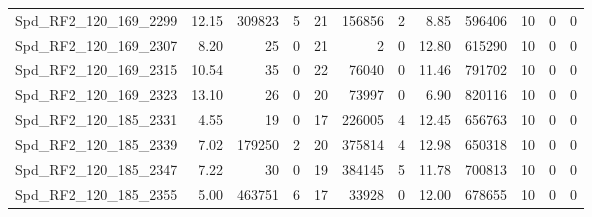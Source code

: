 \begin{longtable}[c]{@{}lrrrrrrrrrrr@{}}
Spd\_RF2\_120\_169\_2299      & 12.15                  & 309823                  & 5                       & 21                     & 156856                  & 2                       & 8.85                    & 596406                   & 10                       & 0                        & 0                        \\
Spd\_RF2\_120\_169\_2307      & 8.20                   & 25                      & 0                       & 21                     & 2                       & 0                       & 12.80                   & 615290                   & 10                       & 0                        & 0                        \\
Spd\_RF2\_120\_169\_2315      & 10.54                  & 35                      & 0                       & 22                     & 76040                   & 0                       & 11.46                   & 791702                   & 10                       & 0                        & 0                        \\
Spd\_RF2\_120\_169\_2323      & 13.10                  & 26                      & 0                       & 20                     & 73997                   & 0                       & 6.90                    & 820116                   & 10                       & 0                        & 0                        \\
Spd\_RF2\_120\_185\_2331      & 4.55                   & 19                      & 0                       & 17                     & 226005                  & 4                       & 12.45                   & 656763                   & 10                       & 0                        & 0                        \\
Spd\_RF2\_120\_185\_2339      & 7.02                   & 179250                  & 2                       & 20                     & 375814                  & 4                       & 12.98                   & 650318                   & 10                       & 0                        & 0                        \\
Spd\_RF2\_120\_185\_2347      & 7.22                   & 30                      & 0                       & 19                     & 384145                  & 5                       & 11.78                   & 700813                   & 10                       & 0                        & 0                        \\
Spd\_RF2\_120\_185\_2355      & 5.00                   & 463751                  & 6                       & 17                     & 33928                   & 0                       & 12.00                   & 678655                   & 10                       & 0                        & 0                        \\

\end{longtable}
